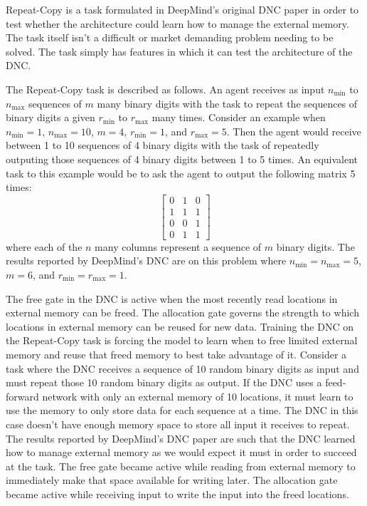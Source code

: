 Repeat-Copy is a task formulated in DeepMind's original DNC paper
\cite{graves2016hybrid} in order to test whether the architecture could
learn how to manage the external memory. The task itself isn't a difficult or
market demanding problem needing to be solved. The task simply has features in
which it can test the architecture of the DNC.

The Repeat-Copy task is described as follows. An agent receives as input
$n_{\textrm{min}}$ to $n_{\textrm{max}}$ sequences of $m$ many binary digits with
the task to repeat the sequences of binary digits a given $r_{\textrm{min}}$ to
$r_{\textrm{max}}$ many times. Consider an example when $n_{\textrm{min}} = 1$,
$n_{\textrm{max}} = 10$, $m = 4$, $r_{\textrm{min}} = 1$, and $r_{\textrm{max}} = 5$.
Then the agent would receive between 1 to 10 sequences of 4 binary digits with
the task of repeatedly outputing those sequences of 4 binary digits between 1
to 5 times. An equivalent task to this example would be to ask the agent to
output the following matrix 5 times:
$$
\begin{bmatrix}
    0 & 1 & 0 \\
    1 & 1 & 1 \\
    0 & 0 & 1 \\
    0 & 1 & 1
\end{bmatrix}
$$
where each of the $n$ many columns represent a sequence of $m$ binary digits.
The results reported by DeepMind's DNC \cite{graves2016hybrid} are on this
problem where $n_{\textrm{min}} = n_{\textrm{max}} = 5$, $m = 6$, and
$r_{\textrm{min}} = r_{\textrm{max}} = 1$.

The free gate in the DNC is active when the most recently read locations in
external memory can be freed. The allocation gate governs the strength to which
locations in external memory can be reused for new data. Training the DNC on
the Repeat-Copy task is forcing the model to learn when to free limited
external memory and reuse that freed memory to best take advantage of it.
Consider a task where the DNC receives a sequence of 10 random binary digits as
input and must repeat those 10 random binary digits as output. If the DNC uses
a feed-forward network with only an external memory of 10 locations, it must
learn to use the memory to only store data for each sequence at a time. The
DNC in this case doesn't have enough memory space to store all input it
receives to repeat. The results reported by DeepMind's DNC paper
\cite{graves2016hybrid} are such that the DNC learned how to manage external
memory as we would expect it must in order to succeed at the task. The free
gate became active while reading from external memory to immediately make that
space available for writing later. The allocation gate became active while
receiving input to write the input into the freed locations.

